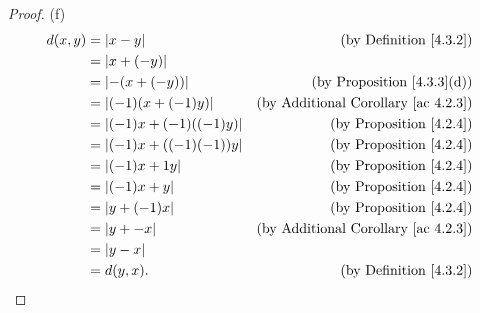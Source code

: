 \begin{proof}{(f)}
    \begin{align*}
        d(x, y) & = \abs*{x - y}               & \text{(by Definition \ref{4.3.2})}              \\
                & = \abs*{x + (-y)}                                                              \\
                & = \abs*{-(x + (-y))}         & \text{(by Proposition \ref{4.3.3}(d))}          \\
                & = \abs*{(-1)(x + (-1)y)}     & \text{(by Additional Corollary \ref{ac 4.2.3})} \\
                & = \abs*{(-1)x + (-1)((-1)y)} & \text{(by Proposition \ref{4.2.4})}             \\
                & = \abs*{(-1)x + ((-1)(-1))y} & \text{(by Proposition \ref{4.2.4})}             \\
                & = \abs*{(-1)x + 1y}          & \text{(by Proposition \ref{4.2.4})}             \\
                & = \abs*{(-1)x + y}           & \text{(by Proposition \ref{4.2.4})}             \\
                & = \abs*{y + (-1)x}           & \text{(by Proposition \ref{4.2.4})}             \\
                & = \abs*{y + -x}              & \text{(by Additional Corollary \ref{ac 4.2.3})} \\
                & = \abs*{y - x}                                                                 \\
                & = d(y, x).                   & \text{(by Definition \ref{4.3.2})}
    \end{align*}
\end{proof}

